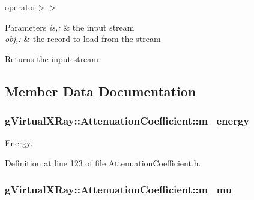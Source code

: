 operator$>$$>$ 


\begin{DoxyParams}{Parameters}
{\em is,:} & the input stream \\
\hline
{\em obj,:} & the record to load from the stream \\
\hline
\end{DoxyParams}
\begin{DoxyReturn}{Returns}
the input stream 
\end{DoxyReturn}


\subsection{Member Data Documentation}
\hypertarget{classg_virtual_x_ray_1_1_attenuation_coefficient_a5509f09245e43a41abd163903a47c22e}{
\subsubsection[{m\_\-energy}]{ {\bf gVirtualXRay::AttenuationCoefficient::m\_\-energy}}}
\label{classg_virtual_x_ray_1_1_attenuation_coefficient_a5509f09245e43a41abd163903a47c22e}


Energy. 



Definition at line 123 of file AttenuationCoefficient.h.

\hypertarget{classg_virtual_x_ray_1_1_attenuation_coefficient_a4bd6596ca07d9c736c00839b0e5820d3}{
\subsubsection[{m\_\-mu}]{ {\bf gVirtualXRay::AttenuationCoefficient::m\_\-mu}}}
\label{classg_virtual_x_ray_1_1_attenuation_coefficient_a4bd6596ca07d9c736c00839b0e5820d3}


